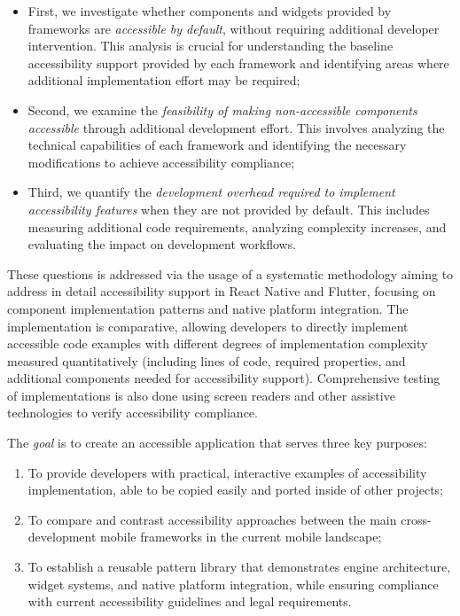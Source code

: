 \begin{itemize}
    \item First, we investigate whether components and widgets provided by frameworks are \textit{accessible by default}, without requiring additional developer intervention. This analysis is crucial for understanding the baseline accessibility support provided by each framework and identifying areas where additional implementation effort may be required;
    
    \item Second, we examine the \textit{feasibility of making non-accessible components accessible} through additional development effort. This involves analyzing the technical capabilities of each framework and identifying the necessary modifications to achieve accessibility compliance;
    
    \item Third, we quantify the \textit{development overhead required to implement accessibility features} when they are not provided by default. This includes measuring additional code requirements, analyzing complexity increases, and evaluating the impact on development workflows.
\end{itemize}

These questions is addressed via the usage of a systematic methodology aiming to address in detail accessibility support in React Native and Flutter, focusing on component implementation patterns and native platform integration. The implementation is comparative, allowing developers to directly implement accessible code examples with different degrees of implementation complexity measured quantitatively (including lines of code, required properties, and additional components needed for accessibility support). Comprehensive testing of implementations is also done using screen readers and other assistive technologies to verify accessibility compliance.

The \textit{goal} is to create an accessible application that serves three key purposes:
\begin{enumerate}
    \item To provide developers with practical, interactive examples of accessibility implementation, able to be copied easily and ported inside of other projects;
    
    \item To compare and contrast accessibility approaches between the main cross-development mobile frameworks in the current mobile landscape;
    
    \item To establish a reusable pattern library that demonstrates engine architecture, widget systems, and native platform integration, while ensuring compliance with current accessibility guidelines and legal requirements.
\end{enumerate}

